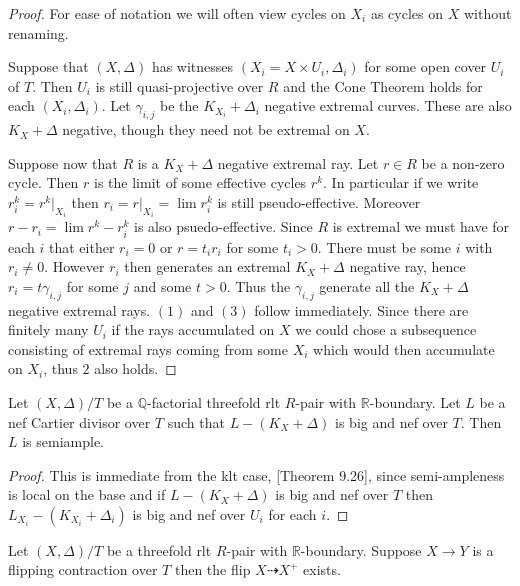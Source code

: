 \documentclass[a4paper,12pt]{amsart}
\begin{document}
	
	\begin{proof}
		
		For ease of notation we will often view cycles on $X_{i}$ as cycles on $X$ without renaming.
		
		Suppose that $(X,\Delta)$ has witnesses $(X_{i}=X \times U_{i}, \Delta_{i})$ for some open cover $U_{i}$ of $T$. Then $U_{i}$ is still quasi-projective over $R$ and the Cone Theorem holds for each $(X_{i},\Delta_{i})$. Let $\gamma_{i,j}$ be the $K_{X_{i}}+\Delta_{i}$ negative extremal curves. These are also $K_{X}+\Delta$ negative, though they need not be extremal on $X$.
		
		Suppose now that $R$ is a $K_{X}+\Delta$ negative extremal ray. Let $r\in R$ be a non-zero cycle. Then $r$ is the limit of some effective cycles $r^{k}$. In particular if we write $r^{k}_{i}=r^{k}|_{X_{i}}$ then $r_{i}=r|_{X_{i}}=\lim r^{k}_{i}$ is still pseudo-effective. Moreover $r-r_{i}=\lim r^{k}-r^{k}_{i}$ is also psuedo-effective. Since $R$ is extremal we must have for each $i$ that either $r_{i}=0$ or $r=t_{i}r_{i}$ for some $t_{i} > 0$. There must be some $i$ with $r_{i} \neq 0$. However $r_{i}$ then generates an extremal $K_{X}+\Delta$ negative ray, hence $r_{i}=t\gamma_{i,j}$ for some $j$ and some $t>0$. Thus the $\gamma_{i,j}$ generate all the $K_{X}+\Delta$ negative extremal rays. $(1)$ and $(3)$ follow immediately. Since there are finitely many $U_{i}$ if the rays accumulated on $X$ we could chose a subsequence consisting of extremal rays coming from some $X_{i}$ which would then accumulate on $X_{i}$, thus $2$ also holds.
	\end{proof}

	\begin{theorem}
		Let $(X,\Delta)/T$ be a $\mathbb{Q}$-factorial threefold rlt $R$-pair with $\mathbb{R}$-boundary. Let $L$ be a nef Cartier divisor over $T$ such that $L-(K_{X}+\Delta)$ is big and nef over $T$. Then $L$ is semiample.
	\end{theorem}
	
	\begin{proof}
		This is immediate from the klt case, \cite{bhatt2020globally+}[Theorem 9.26], since semi-ampleness is local on the base and if $L-(K_{X}+\Delta)$ is big and nef over $T$ then $L_{X_{i}}-(K_{X_{i}}+\Delta_{i})$ is big and nef over $U_{i}$ for each $i$.
	\end{proof}

	\begin{theorem}
	Let $(X,\Delta)/T$ be a threefold rlt $R$-pair with $\mathbb{R}$-boundary. Suppose $X \to Y$ is a flipping contraction over $T$ then the flip $X \dashrightarrow X^{+}$ exists. 
	\end{theorem}
\end{document}
